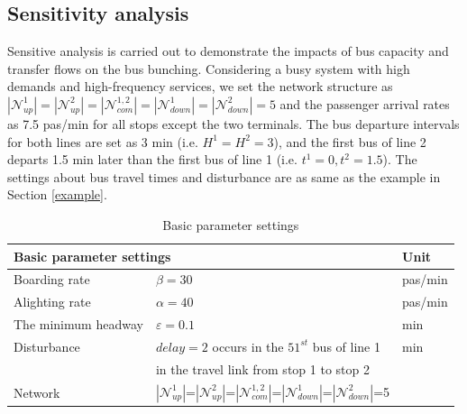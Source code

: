 \documentclass[smallextended]{svjour3}       %
\begin{document}
\begin{Abstract}
\subsection{Sensitivity analysis}\label{sensitivity}
Sensitive analysis is carried out to demonstrate the impacts of bus capacity and transfer flows on the bus bunching.
Considering a busy system with high demands and high-frequency services, 
we set the network structure as 
$\left| \mathcal{N}_{up}^{1}\right|=
\left| \mathcal{N}_{up}^{2} \right|=
\left| \mathcal{N}_{com}^{1,2} \right|=
\left| \mathcal{N}_{down}^{1} \right|=
\left| \mathcal{N}_{down}^{2} \right| = 5$
and the passenger arrival rates as 7.5 pas/min for all stops except the two terminals. 
The bus departure intervals for both lines are set as 3 min (i.e. $H^{1}=H^{2}=3$), 
and the first bus of line 2 departs 1.5 min later than the first bus of line 1 (i.e. $t^{1}=0,t^{2}=1.5$). 
The settings about bus travel times and disturbance are as same as the example in Section \ref{example}. 
\begin{table}[H]
  \caption{Basic parameter settings}
  \centering
  \begin{tabular}{p{3.4cm}p{6.5cm}p{1.1cm}}
      \hline
      \multicolumn{2}{l}{\textbf{Basic parameter settings}} & \textbf{Unit}      \\ \hline
      Boarding rate & $\beta=30$                            & pas/min            \\ 
      Alighting rate & $\alpha=40$                          & pas/min            \\ 
      The minimum headway & $\varepsilon=0.1$               & min                \\      
      Disturbance & $delay=2$  occurs in the $51^{st}$ bus of line 1&min         \\ 
                  & in the travel link from stop 1 to stop 2                     \\ 
      Network     & $|\mathcal{N}_{up}^{1}|$=$|\mathcal{N}_{up}^{2}|$=$|\mathcal{N}_{com}^{1,2}|$=$|\mathcal{N}_{down}^{1}|$=$|\mathcal{N}_{down}^{2}|$=5& \\

\end{tabular}
\end{table}
\end{Abstract}
\end{document}
